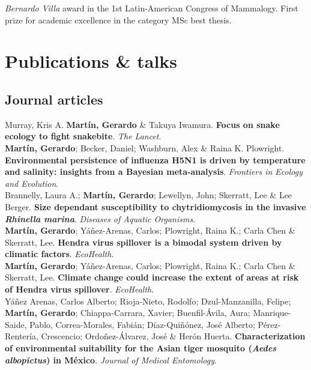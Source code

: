 \documentclass[12pt, a4paper]{article}
\newcommand{\years}[1]{\marginnote{\scriptsize #1}}
\begin{document}
\years{2010} \emph{Bernardo Villa} award in the 1st Latin-American Congress of Mammalogy. First prize for academic excellence in the category MSc best thesis.\\

\section*{Publications \& talks}

\subsection*{Journal articles}
\noindent 

\years{2020} Murray, Kris A. \textbf{Mart\'in, Gerardo} \& Takuya Iwamura. \textbf{Focus on snake ecology to fight snakebite}. \emph{The Lancet}.\\

\years{2018} \textbf{Mart\'in, Gerardo}; Becker, Daniel; Washburn, Alex \& Raina K. Plowright. \textbf{Environmental persistence of influenza H5N1 is driven by temperature and salinity: insights from a Bayesian meta-analysis}. \emph{Frontiers in Ecology and Evolution}.\\

\years{2018} Brannelly, Laura A.; \textbf{Mart\'in, Gerardo}; Lewellyn, John; Skerratt, Lee \& Lee Berger. \textbf{Size dependant susceptibility to chytridiomycosis in the invasive \emph{Rhinella marina}}. \emph{Diseases of Aquatic Organisms}.\\

\years{2018} \textbf{Mart\'in, Gerardo}; Y\'a\~nez-Arenas, Carlos; Plowright, Raina K.; Carla Chen \& Skerratt, Lee. \textbf{Hendra virus spillover is a bimodal system driven by climatic factors}. \emph{EcoHealth}.\\

\years{2018} \textbf{Mart\'in, Gerardo}; Y\'a\~nez-Arenas, Carlos; Plowright, Raina K.; Carla Chen \& Skerratt, Lee. \textbf{Climate change could increase the extent of areas at risk of Hendra virus spillover}. \emph{EcoHealth}.\\

\years{2017} Y\'a\~nez Arenas, Carlos Alberto; Rioja-Nieto, Rodolfo; Dzul-Manzanilla, Felipe; \textbf{Mart\'in, Gerardo}; Chiappa-Carrara, Xavier; Buenfil-\'Avila, Aura; Manrique-Saide, Pablo, Correa-Morales, Fabi\'an; D\'iaz-Qui\~n\'onez, Jos\'e Alberto; P\'erez-Renter\'ia, Crescencio; Ordo\~nez-\'Alvarez, Jos\'e \& Her\'on Huerta. \textbf{Characterization of environmental suitability for the Asian tiger mosquito (\emph{Aedes albopictus}) in M\'exico}. \emph{Journal of Medical Entomology}.\\
\end{document}
